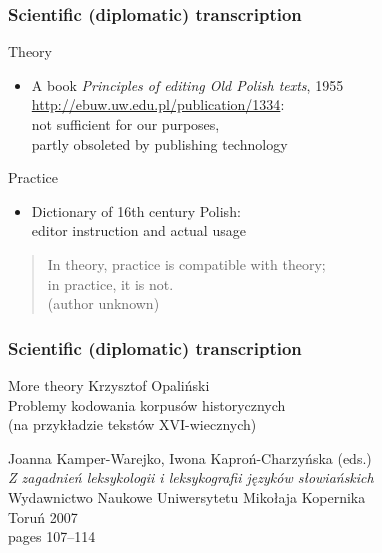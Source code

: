 \documentclass[pdfpagemode=UseNone]{beamer}
\begin{document}
\begin{frame}
  \frametitle{Scientific (diplomatic) transcription}
  \begin{block}{Theory}
    \begin{itemize}
    \item A book \textit{Principles of editing Old Polish texts}, 1955\\
      \url{http://ebuw.uw.edu.pl/publication/1334}:\\
      not sufficient for our purposes,\\ partly obsoleted by publishing technology
    \end{itemize}
  \end{block}
  \begin{block}{Practice}
    \begin{itemize}
    \item Dictionary of 16th century Polish:\\editor instruction and actual usage
    \end{itemize}
  \end{block}
  \begin{quote}
    In theory, practice is compatible with theory;\\
    in practice, it is not.\\
    (author unknown)
  \end{quote}
\end{frame}
\begin{frame}
  \frametitle{Scientific (diplomatic) transcription}
  \begin{block}{More theory}
    Krzysztof Opaliński\\
    Problemy kodowania korpusów historycznych\\
    (na przykładzie tekstów XVI-wiecznych)

    \bigskip
    Joanna Kamper-Warejko, Iwona Kaproń-Charzyńska (eds.)\\
    \textit{Z zagadnień leksykologii i leksykografii języków słowiańskich}\\
    Wydawnictwo Naukowe Uniwersytetu Mikołaja Kopernika\\
    Toruń 2007\\
    pages 107--114

  \end{block}
\end{frame}

\end{document}

